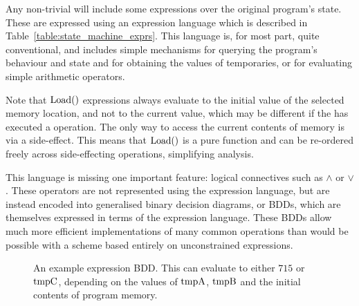 Any non-trivial {\StateMachine} will include some expressions over the
original program's state.  These are expressed using an expression
language which is described in Table~\ref{table:state_machine_exprs}.
This language is, for most part, quite conventional, and includes
simple mechanisms for querying the program's behaviour and state and
for obtaining the values of {\StateMachine} temporaries, or for
evaluating simple arithmetic operators.

Note that $\mathrm{Load}()$ expressions always evaluate to the initial value
of the selected memory location, and not to the current value, which
may be different if the {\StateMachine} has executed a 
operation.  The only way to access the current contents of memory is
via a  side-effect.  This means that $\mathrm{Load}()$ is a pure
function and can be re-ordered freely across side-effecting
operations, simplifying analysis.

This language is missing one important feature: logical connectives
such as $\wedge$ or $\vee$.  These operators are not represented using
the expression language, but are instead encoded into generalised
binary decision diagrams, or BDDs\needCite{}, which are themselves
expressed in terms of the expression language.  These BDDs allow much
more efficient implementations of many common operations than would be
possible with a scheme based entirely on unconstrained
expressions.

\begin{figure}
  \begin{center}
  \end{center}
  \caption{An example expression BDD.  This can evaluate to either
    $715$ or $\mathrm{tmpC}$, depending on the values of $\mathrm{tmpA}$,
    $\mathrm{tmpB}$ and the initial contents of program memory.}
  \label{fig:derive:example_expr_bdd}
\end{figure}

